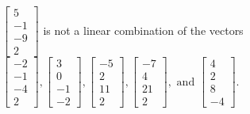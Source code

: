 \begin{exercise}
\begin{exerciseStatement}
  \end{exerciseStatement}
  \begin{exerciseAnswer}
   \(\left[\begin{array}{c}
5 \\
-1 \\
-9 \\
2
\end{array}\right]\) 
  	 is not  
	a linear combination of the vectors \(\left[\begin{array}{c}
-2 \\
-1 \\
-4 \\
2
\end{array}\right] , \left[\begin{array}{c}
3 \\
0 \\
-1 \\
-2
\end{array}\right] , \left[\begin{array}{c}
-5 \\
2 \\
11 \\
2
\end{array}\right] , \left[\begin{array}{c}
-7 \\
4 \\
21 \\
2
\end{array}\right] , \text{ and } \left[\begin{array}{c}
4 \\
2 \\
8 \\
-4
\end{array}\right]\).

	
  


  \end{exerciseAnswer}
\end{exercise}